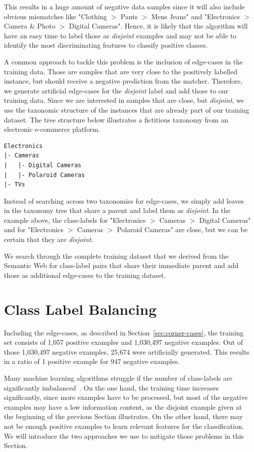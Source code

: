 This results in a huge amount of negative data samples since it will also include obvious mismatches like
"Clothing $>$ Pants $>$ Mens Jeans" and "Electronics $>$ Camera \& Photo $>$ Digital Cameras".
Hence, it is likely that the algorithm will have an easy time to label those as \emph{disjoint} examples and may not be
able to identify the most discriminating features to classify positive classes.

A common approach to tackle this problem is the inclusion of edge-cases in the training data.
Those are samples that are very close to the positively labelled instance, but should receive a negative prediction
from the matcher.
Therefore, we generate artificial edge-cases for the \emph{disjoint} label and add those to our training data.
Since we are interested in samples that are close, but \emph{disjoint}, we use the taxonomic structure of the instances
that are already part of our training dataset.
The tree structure below illustrates a fictitious taxonomy from an electronic e-commerce platform.
\begin{verbatim}
Electronics
|- Cameras
|   |- Digital Cameras
|   |- Polaroid Cameras
|- TVs
\end{verbatim}
Instead of searching across two taxonomies for edge-cases, we simply add leaves in the taxonomy tree that share a parent
and label them as \emph{disjoint}.
In the example above, the class-labels for "Electronics $>$ Cameras $>$ Digital Cameras" and for
"Electronics $>$ Cameras $>$ Polaroid Cameras" are close, but we can be certain that they are \emph{disjoint}.

We search through the complete training dataset that we derived from the Semantic Web for class-label pairs that share
their immediate parent and add those as additional edge-cases to the training dataset.

\section{Class Label Balancing}
\label{sec:label-balancing}

Including the edge-cases, as described in Section~\ref{sec:corner-cases}, the training set consists of
1,057 positive examples and 1,030,497 negative examples.
Out of those 1,030,497 negative examples, 25,674 were artificially generated.
This results in a ratio of 1 positive example for 947 negative examples.

Many machine learning algorithms struggle if the number of class-labels are significantly
imbalanced~\cite{chawla2002smote}.
On the one hand, the training time increases significantly, since more examples have to be processed,
but most of the negative examples may have a low information content, as the disjoint example given at the beginning of the
previous Section illustrates.
On the other hand, there may not be enough positive examples to learn relevant features for the classification.
We will introduce the two approaches we use to mitigate those problems in this Section.

